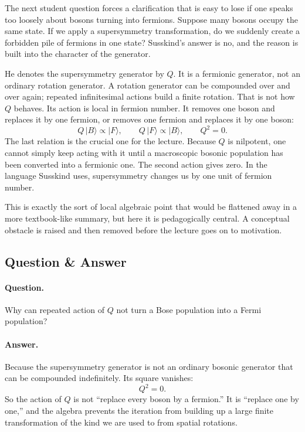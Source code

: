 The next student question forces a clarification that is easy to lose if one speaks too loosely about bosons turning into fermions. Suppose many bosons occupy the same state. If we apply a supersymmetry transformation, do we suddenly create a forbidden pile of fermions in one state? Susskind's answer is no, and the reason is built into the character of the generator.

He denotes the supersymmetry generator by \(Q\). It is a fermionic generator, not an ordinary rotation generator. A rotation generator can be compounded over and over again; repeated infinitesimal actions build a finite rotation. That is not how \(Q\) behaves. Its action is local in fermion number. It removes one boson and replaces it by one fermion, or removes one fermion and replaces it by one boson:
\begin{equation}
Q\,|B\rangle \propto |F\rangle,
\qquad
Q\,|F\rangle \propto |B\rangle,
\qquad
Q^2=0.
\end{equation}
The last relation is the crucial one for the lecture. Because \(Q\) is nilpotent, one cannot simply keep acting with it until a macroscopic bosonic population has been converted into a fermionic one. The second action gives zero. In the language Susskind uses, supersymmetry changes us by one unit of fermion number.

This is exactly the sort of local algebraic point that would be flattened away in a more textbook-like summary, but here it is pedagogically central. A conceptual obstacle is raised and then removed before the lecture goes on to motivation.

\subsection{Question \& Answer}

\paragraph{Question.} Why can repeated action of \(Q\) not turn a Bose population into a Fermi population?

\paragraph{Answer.} Because the supersymmetry generator is not an ordinary bosonic generator that can be compounded indefinitely. Its square vanishes:
\begin{equation}
Q^2=0.
\end{equation}
So the action of \(Q\) is not “replace every boson by a fermion.” It is “replace one by one,” and the algebra prevents the iteration from building up a large finite transformation of the kind we are used to from spatial rotations.

